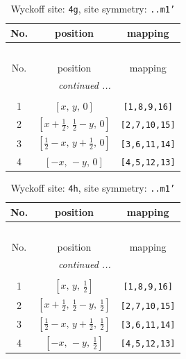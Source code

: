 \documentclass[fleqn,8pt]{jsarticle}
\begin{document}
\renewcommand{\arraystretch}{1.2}
\begin{longtable}{ccc}
\caption{Wyckoff site: {\tt 4g}, site symmetry: {\tt ..m1'}}
 \\
 \hline \hline
No. & position & mapping \\ \hline \endfirsthead

\multicolumn{2}{l}{\tablename\ \thetable{}} \\
 \hline \hline
No. & position & mapping \\ \hline \endhead

 \hline \hline
\multicolumn{2}{r}{\footnotesize\it continued ...} \\ \endfoot

 \hline \hline
\multicolumn{2}{r}{} \\ \endlastfoot

1 & $\left[ x,\, y,\, 0 \right]$ & {\tt [1,8,9,16]} \\ \hline
2 & $\left[ x + \frac{1}{2},\, \frac{1}{2} - y,\, 0 \right]$ & {\tt [2,7,10,15]} \\ \hline
3 & $\left[ \frac{1}{2} - x,\, y + \frac{1}{2},\, 0 \right]$ & {\tt [3,6,11,14]} \\ \hline
4 & $\left[ - x,\, - y,\, 0 \right]$ & {\tt [4,5,12,13]} \\
\end{longtable}
\renewcommand{\arraystretch}{1.2}
\begin{longtable}{ccc}
\caption{Wyckoff site: {\tt 4h}, site symmetry: {\tt ..m1'}}
 \\
 \hline \hline
No. & position & mapping \\ \hline \endfirsthead

\multicolumn{2}{l}{\tablename\ \thetable{}} \\
 \hline \hline
No. & position & mapping \\ \hline \endhead

 \hline \hline
\multicolumn{2}{r}{\footnotesize\it continued ...} \\ \endfoot

 \hline \hline
\multicolumn{2}{r}{} \\ \endlastfoot

1 & $\left[ x,\, y,\, \frac{1}{2} \right]$ & {\tt [1,8,9,16]} \\ \hline
2 & $\left[ x + \frac{1}{2},\, \frac{1}{2} - y,\, \frac{1}{2} \right]$ & {\tt [2,7,10,15]} \\ \hline
3 & $\left[ \frac{1}{2} - x,\, y + \frac{1}{2},\, \frac{1}{2} \right]$ & {\tt [3,6,11,14]} \\ \hline
4 & $\left[ - x,\, - y,\, \frac{1}{2} \right]$ & {\tt [4,5,12,13]} \\
\end{longtable}
\end{document}
